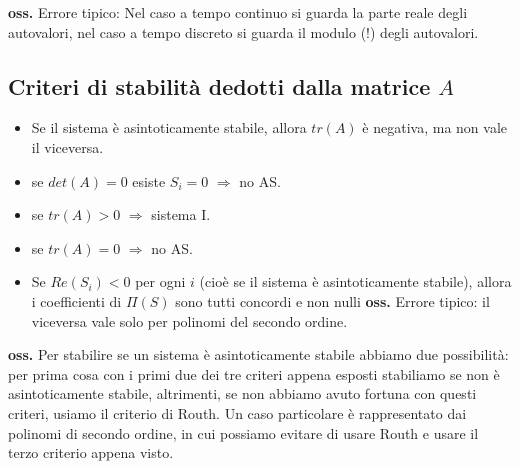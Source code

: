     \textbf{oss.} Errore tipico: Nel caso a tempo continuo si guarda la parte reale degli autovalori, nel caso a tempo discreto si guarda il modulo (!) degli autovalori.
    \subsection{Criteri di stabilità dedotti dalla matrice $A$}
    \begin{itemize}
        \item Se il sistema è asintoticamente stabile, allora $tr(A)$ è negativa, ma non vale il viceversa.
        \item se $det(A) = 0$ esiste $S_i = 0$ $\Longrightarrow$ no AS.
        \item se $tr(A) >0$ $\Longrightarrow$ sistema I.
        \item se $tr(A) = 0$ $\Longrightarrow$ no AS.
        \item Se $Re(S_i)<0$ per ogni $i$ (cioè se il sistema è asintoticamente stabile), allora i coefficienti di $\Pi(S)$ sono tutti concordi e non nulli \newline
        \textbf{oss.} Errore tipico: il viceversa vale solo per polinomi del secondo ordine.
    \end{itemize}
    \textbf{oss.} Per stabilire se un sistema è asintoticamente stabile abbiamo due possibilità: per prima cosa con i primi due dei tre criteri appena esposti stabiliamo se non è asintoticamente stabile, altrimenti, se non abbiamo avuto fortuna con questi criteri, usiamo il criterio di Routh. Un caso particolare è rappresentato dai polinomi di secondo ordine, in cui possiamo evitare di usare Routh e usare il terzo criterio appena visto.
